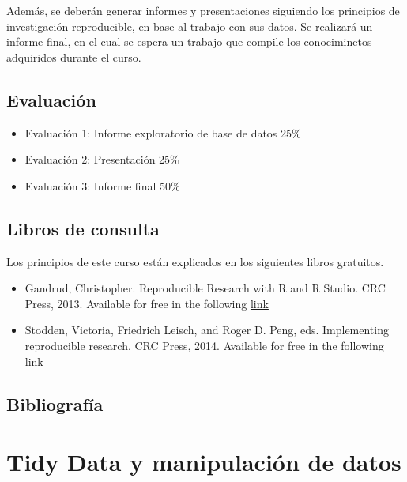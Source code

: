 \documentclass[]{book}
\providecommand{\tightlist}{%
  \setlength{\itemsep}{0pt}\setlength{\parskip}{0pt}}
\begin{document}
Además, se deberán generar informes y presentaciones siguiendo los
principios de investigación reproducible, en base al trabajo con sus
datos. Se realizará un informe final, en el cual se espera un trabajo
que compile los conociminetos adquiridos durante el curso.

\hypertarget{evaluacion}{%
\section{Evaluación}\label{evaluacion}}

\begin{itemize}
\tightlist
\item
  Evaluación 1: Informe exploratorio de base de datos 25\%
\item
  Evaluación 2: Presentación 25\%
\item
  Evaluación 3: Informe final 50\%
\end{itemize}

\hypertarget{libros-de-consulta}{%
\section{Libros de consulta}\label{libros-de-consulta}}

Los principios de este curso están explicados en los siguientes libros
gratuitos.

\begin{itemize}
\tightlist
\item
  Gandrud, Christopher. Reproducible Research with R and R Studio. CRC
  Press, 2013. Available for free in the following
  \href{https://englianhu.files.wordpress.com/2016/01/reproducible-research-with-r-and-studio-2nd-edition.pdf}{link}
\item
  Stodden, Victoria, Friedrich Leisch, and Roger D. Peng, eds.
  Implementing reproducible research. CRC Press, 2014. Available for
  free in the following
  \href{http://web.stanford.edu/~vcs/papers/ijclp-STODDEN-2009.pdf}{link}
\end{itemize}

\hypertarget{bibliografia}{%
\section{Bibliografía}\label{bibliografia}}

\hypertarget{tidydata}{%
\chapter{Tidy Data y manipulación de datos}\label{tidydata}}
\end{document}
